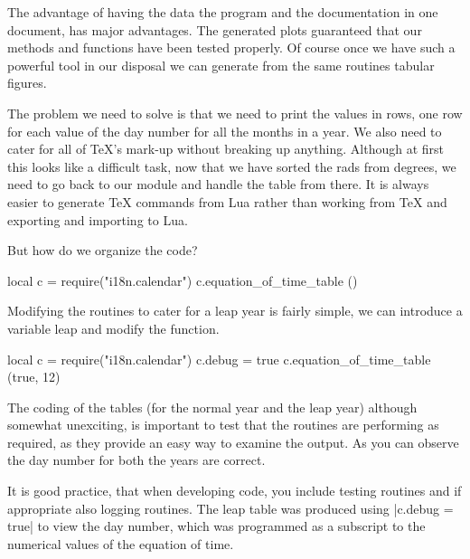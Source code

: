 The advantage of having the data the program and the documentation in one document, has major advantages. The generated plots guaranteed that our methods and functions have been tested properly. Of course once we have such a powerful tool in our disposal we can generate from the same routines tabular figures. 



The problem we need to solve is that we need to print the values in rows, one row for each value of the day number for all the months in a year. We also need to cater for all of TeX's mark-up without breaking up anything. Although at first this looks like a difficult task, now that we have sorted the rads from degrees, we need to go back to our module and handle the table from there. It is always easier to generate TeX commands from Lua rather than working from TeX and exporting and importing to Lua.

But how do we organize the code? 


\begin{scriptexample}{}{}
\bgroup
\scriptsize
\begin{luacode}
local c = require("i18n.calendar") 
c.equation_of_time_table ()
\end{luacode}
\egroup
\end{scriptexample}

Modifying the routines to cater for a leap year is fairly simple, we can introduce a variable leap and modify the  function. 


\bgroup
\footnotesize
\begin{luacode}
local c = require("i18n.calendar") 
c.debug = true
c.equation_of_time_table (true, 12)
\end{luacode}
\par

\egroup


The coding of the tables (for the normal year and the leap year) although somewhat unexciting, is important to test that the routines are performing as required, as they provide an easy way to examine the output. As you can observe the day number for both the years are correct. 

It is good practice, that when developing code, you include testing routines and if appropriate also logging routines. The leap table was produced using |c.debug = true|  to view the day number, which was programmed as a subscript to the numerical values of the equation of time.

